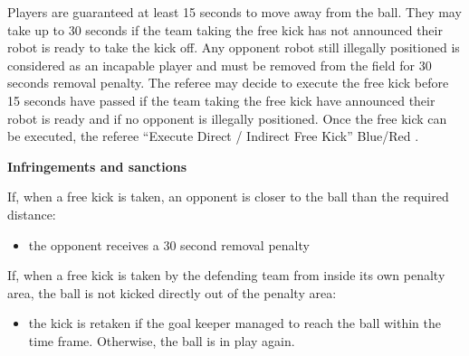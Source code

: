 Players are guaranteed at least 15 seconds to move away from the ball.
They may take up to 30 seconds if the team taking the free kick has not
announced their robot is ready to take the kick off.
Any opponent robot still illegally positioned is considered as an incapable
player and must be removed from the field for 30 seconds removal penalty.
The referee may decide to execute the free kick before 15 seconds have passed if
the team taking the free kick have announced their robot is ready and if no
opponent is illegally positioned.
Once the free kick can be executed, the referee   ``Execute Direct / Indirect Free Kick'' Blue/Red .

\bigskip

{\bfseries Infringements and sanctions}

\headlinebox

If, when a free kick is taken, an opponent is closer to the ball than the required distance:

\begin{itemize}
\item the opponent receives a 30 second removal penalty 
\end{itemize}

If, when a free kick is taken by the defending team from inside its own penalty area, the ball is not kicked directly out of the penalty area:


\begin{itemize}
\item the kick is retaken  if the goal keeper managed to reach the ball within the time frame. Otherwise, the ball is in play again.
\end{itemize}

\bigskip

